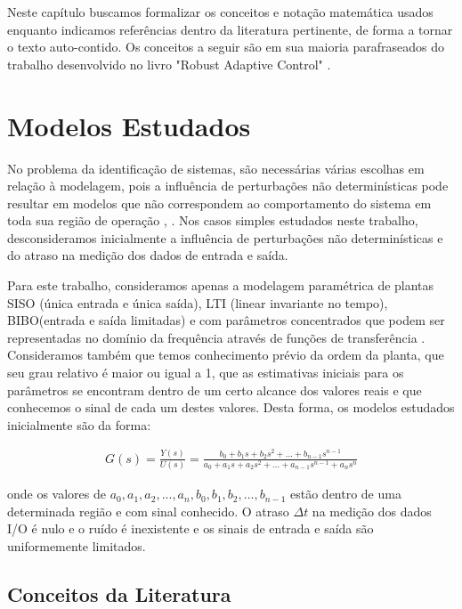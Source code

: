 \documentclass[
	12pt,				%
	openright,			%
	twoside,			%
	a4paper,			%
	english,			%
	french,				%
	spanish,			%
	brazil				%
	]{abntex2}
\begin{document}

Neste capítulo buscamos formalizar os conceitos e notação matemática usados enquanto indicamos referências dentro da literatura pertinente, de forma a tornar o texto auto-contido. Os conceitos a seguir são em sua maioria parafraseados do trabalho desenvolvido no livro "Robust Adaptive Control" \cite{ioannou2}.

\chapter{Modelos Estudados}

 No problema da identificação de sistemas, são necessárias várias escolhas em relação à modelagem, pois a influência de perturbações não determinísticas pode resultar em modelos que não correspondem ao comportamento do sistema em toda sua região de operação \cite{ljung}, \cite{aguirre}. Nos casos simples estudados neste trabalho, desconsideramos inicialmente a influência de perturbações não determinísticas e do atraso na medição dos dados de entrada e saída. 

 Para este trabalho, consideramos apenas a modelagem paramétrica de plantas SISO (única entrada e única saída), LTI (linear invariante no tempo), BIBO(entrada e saída limitadas) e com parâmetros concentrados que podem ser representadas no domínio da frequência através de funções de transferência \cite{chen}\cite{ogata}. Consideramos também que temos conhecimento prévio da ordem da planta, que seu grau relativo é maior ou igual a 1, que as estimativas iniciais para os parâmetros se encontram dentro de um certo alcance dos valores reais e que conhecemos o sinal de cada um destes valores. Desta forma, os modelos estudados inicialmente são da forma:
 
 \begin{align*}
 G(s) = \frac{Y(s)}{U(s)} = \frac{b_0+b_1s+b_2s^2+...+b_{n-1}s^{n-1}}{a_0+a_1s+a_2s^2+...+a_{n-1}s^{n-1}+a_ns^n}
 \end{align*} 

 onde os valores de $a_0, a_1, a_2,...,a_n,b_0,b_1,b_2,...,b_{n-1}$ estão dentro de uma determinada região e com sinal conhecido. O atraso $\Delta t$ na medição dos dados I/O é nulo e o ruído é inexistente e os sinais de entrada e saída são uniformemente limitados. 

\section{Conceitos da Literatura}
\end{document}
